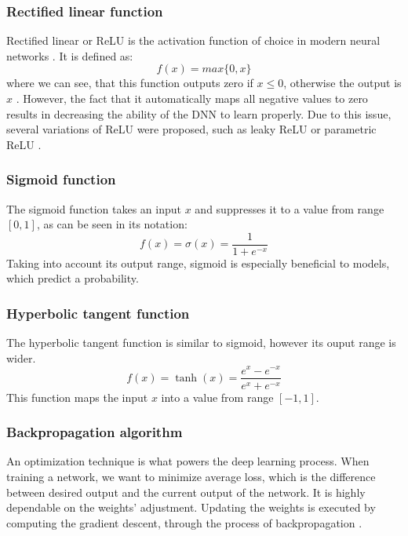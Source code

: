 \vspace{0.8cm}
\subsubsection*{Rectified linear function}
Rectified linear or ReLU is the activation function of choice in modern neural networks \cite{tutorialIEEE}. It is defined as:
\begin{equation}
     f(x) = max\{0, x\}
\end{equation}
where we can see, that this function outputs zero if $x\leq0$, otherwise the output is $x$ \cite{deeplearningbook}. However, the fact that it automatically maps all negative values to zero results in decreasing the ability of the DNN to learn properly. Due to this issue, several variations of ReLU were proposed, such as leaky ReLU or parametric ReLU \cite{tutorialIEEE}.
\subsubsection*{Sigmoid function}
The sigmoid function takes an input $x$ and suppresses it to a value from range $[0,1]$, as can be seen in its notation:
\begin{equation}
    f(x) = \sigma(x)=\frac{1}{1+e^{-x}}
\end{equation}
Taking into account its output range, sigmoid is especially beneficial to models, which predict a probability.
\subsubsection*{Hyperbolic tangent function}
The hyperbolic tangent function is similar to sigmoid, however its ouput range is wider. 
\begin{equation}
    f(x) = \tanh(x)=\frac{e^x-e^{-x}}{e^x+e^{-x}}
\end{equation}
This function maps the input $x$ into a value from range $[-1,1]$.
\subsubsection{Backpropagation algorithm}
An optimization technique is what powers the deep learning process. When training a network, we want to minimize average loss, which is the difference between desired output and the current output of the network. It is highly dependable on the weights' adjustment. Updating the weights is executed by computing the gradient descent, through the process of backpropagation \cite{tutorialIEEE}.

